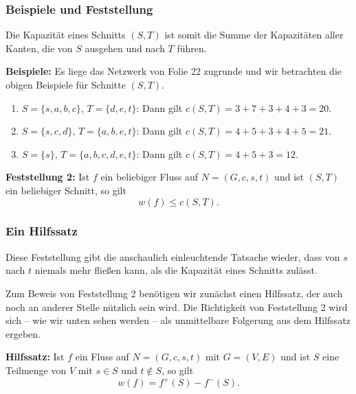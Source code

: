 \documentclass[smaller]{beamer}
\begin{document}
\begin{frame}
\frametitle{Beispiele und Feststellung}
Die Kapazität eines Schnitts $(S,T)$ ist somit die Summe der Kapazitäten aller Kanten, die von $S$ ausgehen und nach $T$ führen. \\ \vspace*{0.2cm}

\textbf{Beispiele:} Es liege das Netzwerk von Folie 22 zugrunde und wir betrachten die obigen Beispiele für Schnitte $(S,T)$.
\begin{enumerate}[\bfseries 1.]
\item $S = \big\{ s,a,b,c \big\}$, $T = \big\{ d,e,t \big\}$: Dann gilt $c(S,T) = 3+7+3+4+3 = 20$.
\item $S = \big\{ s,c,d \big\}$, $T = \big\{ a,b,e,t \big\}$: Dann gilt $c(S,T) = 4+5+3+4+5 = 21$.
\item $S = \big\{ s \big\}$, $T = \big\{ a,b,c,d,e,t \big\}$: Dann gilt $c(S,T) = 4+5+3 = 12$.
\end{enumerate}
 \vspace*{0.2cm}
\textbf{Feststellung 2:} Ist $f$ ein beliebiger Fluss auf $N = (G,c,s,t)$ und ist $(S,T)$ ein beliebiger Schnitt, so gilt
\begin{equation}
\label{eq:9:1}
w(f) \leq c(S,T).
\end{equation}
\end{frame}

\begin{frame}
 \frametitle{Ein Hilfssatz}
 Diese Feststellung gibt die anschaulich einleuchtende Tatsache wieder, dass von $s$ nach $t$ niemals mehr fließen kann, als die Kapazität eines Schnitts zulässt. \\ \vspace*{0.2cm}

Zum Beweis von Feststellung 2 benötigen wir zunächst einen \alert{Hilfssatz, der auch noch an anderer Stelle nützlich sein wird}. Die Richtigkeit von Feststellung 2 wird sich -- wie wir unten sehen werden -- als unmittelbare Folgerung aus dem Hilfssatz ergeben. \\ \vspace*{0.2cm}

\textbf{Hilfssatz:}\label{page:9:4}
Ist $f$ ein Fluss auf $N = (G,c,s,t)$ mit $G=(V,E)$ und ist $S$ eine Teilmenge von $V$ mit $s \in S$ und $t \not\in S$, so gilt
\begin{equation}
\label{eq:9:2}
w(f) = f^+(S) - f^-(S).
\end{equation}
\end{frame}
\end{document}
